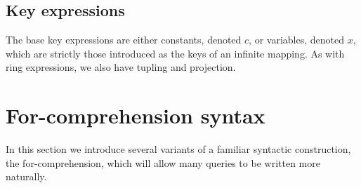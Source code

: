 {{{\subsection{Key expressions} {
The base key expressions are either constants, denoted $c$, or variables, denoted $x$, which are strictly those introduced as the keys of an infinite mapping. As with ring expressions, we also have tupling and projection. 
}

\section{For-comprehension syntax} { \label{forcomp}
In this section we introduce several variants of a familiar syntactic construction, the for-comprehension, which will allow many queries to be written more naturally.

}}}}
